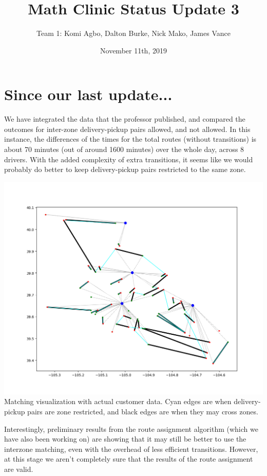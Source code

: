 \documentclass{article}
\title{Math Clinic Status Update 3}
\author{Team 1: Komi Agbo, Dalton Burke, Nick Mako, James Vance}
\date{November 11th, 2019}
\begin{document}
\maketitle

\section{Since our last update...}
We have integrated the data that the professor published, and compared the 
outcomes for inter-zone delivery-pickup pairs allowed, and not allowed. In
this instance, the differences of the times for the total routes (without
transitions) is about 70 minutes (out of around 1600 minutes) over the whole
day, across 8 drivers. With the added complexity of extra transitions, it seems
like we would probably do better to keep delivery-pickup pairs restricted to 
the same zone.

\begin{center}
	\includegraphics[scale=.55]{img/real_data_matching.png}\\
	Matching visualization with actual customer data. Cyan edges are when
	delivery-pickup pairs are zone restricted, and black edges are when
	they may cross zones.
\end{center}

Interestingly, preliminary results from the route assignment algorithm (which
we have also been working on) are showing that it may still be better to use
the interzone matching, even with the overhead of less efficient transitions.
However, at this stage we aren't completely sure that the results of the route
assignment are valid.
\end{document}
